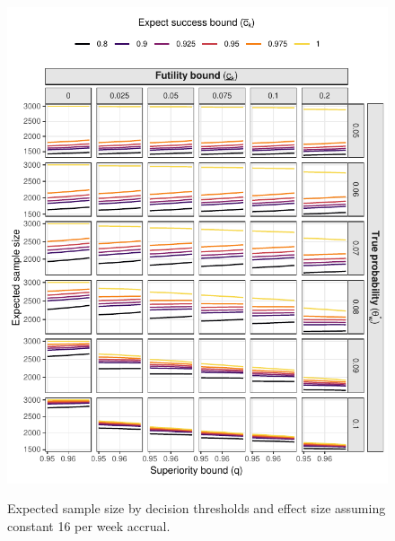 \documentclass{bmcart}
\begin{document}
\begin{figure}[!ht]
	\caption{Expected sample size by decision thresholds and effect size assuming constant 16 per week accrual.}
	\includegraphics{figures/expected_ss_16.pdf}
	\label{fig:expected_ss_16}
\end{figure}
\end{document}
